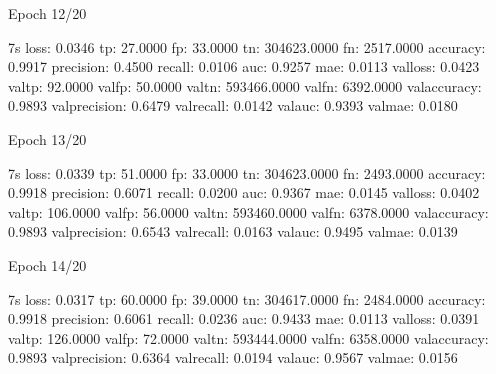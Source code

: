 \documentclass[letterpaper,10pt,english]{sphinxmanual}
\begin{document}
\begin{sphinxVerbatim}[commandchars=\\\{\}]
Epoch 12/20
\end{sphinxVerbatim}

\begin{sphinxVerbatim}[commandchars=\\\{\}]
 \PYGZhy{} 7s \PYGZhy{} loss: 0.0346 \PYGZhy{} tp: 27.0000 \PYGZhy{} fp: 33.0000 \PYGZhy{} tn: 304623.0000 \PYGZhy{} fn: 2517.0000 \PYGZhy{} accuracy: 0.9917 \PYGZhy{} precision: 0.4500 \PYGZhy{} recall: 0.0106 \PYGZhy{} auc: 0.9257 \PYGZhy{} mae: 0.0113 \PYGZhy{} val\PYGZus{}loss: 0.0423 \PYGZhy{} val\PYGZus{}tp: 92.0000 \PYGZhy{} val\PYGZus{}fp: 50.0000 \PYGZhy{} val\PYGZus{}tn: 593466.0000 \PYGZhy{} val\PYGZus{}fn: 6392.0000 \PYGZhy{} val\PYGZus{}accuracy: 0.9893 \PYGZhy{} val\PYGZus{}precision: 0.6479 \PYGZhy{} val\PYGZus{}recall: 0.0142 \PYGZhy{} val\PYGZus{}auc: 0.9393 \PYGZhy{} val\PYGZus{}mae: 0.0180
\end{sphinxVerbatim}

\begin{sphinxVerbatim}[commandchars=\\\{\}]
Epoch 13/20
\end{sphinxVerbatim}

\begin{sphinxVerbatim}[commandchars=\\\{\}]
 \PYGZhy{} 7s \PYGZhy{} loss: 0.0339 \PYGZhy{} tp: 51.0000 \PYGZhy{} fp: 33.0000 \PYGZhy{} tn: 304623.0000 \PYGZhy{} fn: 2493.0000 \PYGZhy{} accuracy: 0.9918 \PYGZhy{} precision: 0.6071 \PYGZhy{} recall: 0.0200 \PYGZhy{} auc: 0.9367 \PYGZhy{} mae: 0.0145 \PYGZhy{} val\PYGZus{}loss: 0.0402 \PYGZhy{} val\PYGZus{}tp: 106.0000 \PYGZhy{} val\PYGZus{}fp: 56.0000 \PYGZhy{} val\PYGZus{}tn: 593460.0000 \PYGZhy{} val\PYGZus{}fn: 6378.0000 \PYGZhy{} val\PYGZus{}accuracy: 0.9893 \PYGZhy{} val\PYGZus{}precision: 0.6543 \PYGZhy{} val\PYGZus{}recall: 0.0163 \PYGZhy{} val\PYGZus{}auc: 0.9495 \PYGZhy{} val\PYGZus{}mae: 0.0139
\end{sphinxVerbatim}

\begin{sphinxVerbatim}[commandchars=\\\{\}]
Epoch 14/20
\end{sphinxVerbatim}

\begin{sphinxVerbatim}[commandchars=\\\{\}]
 \PYGZhy{} 7s \PYGZhy{} loss: 0.0317 \PYGZhy{} tp: 60.0000 \PYGZhy{} fp: 39.0000 \PYGZhy{} tn: 304617.0000 \PYGZhy{} fn: 2484.0000 \PYGZhy{} accuracy: 0.9918 \PYGZhy{} precision: 0.6061 \PYGZhy{} recall: 0.0236 \PYGZhy{} auc: 0.9433 \PYGZhy{} mae: 0.0113 \PYGZhy{} val\PYGZus{}loss: 0.0391 \PYGZhy{} val\PYGZus{}tp: 126.0000 \PYGZhy{} val\PYGZus{}fp: 72.0000 \PYGZhy{} val\PYGZus{}tn: 593444.0000 \PYGZhy{} val\PYGZus{}fn: 6358.0000 \PYGZhy{} val\PYGZus{}accuracy: 0.9893 \PYGZhy{} val\PYGZus{}precision: 0.6364 \PYGZhy{} val\PYGZus{}recall: 0.0194 \PYGZhy{} val\PYGZus{}auc: 0.9567 \PYGZhy{} val\PYGZus{}mae: 0.0156
\end{sphinxVerbatim}
\end{document}
